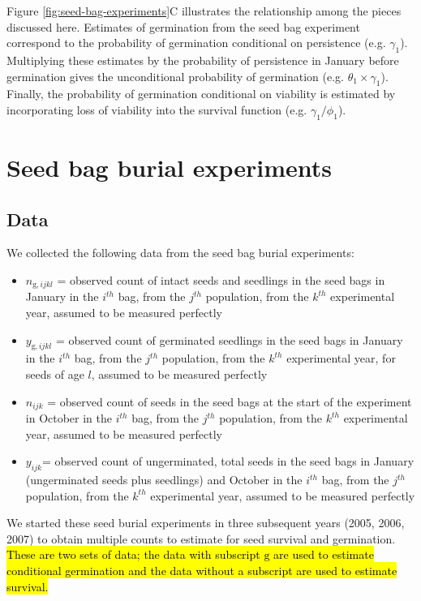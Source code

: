 \documentclass[12pt, oneside, titlepage]{article}   	%
\begin{document}
Figure \ref{fig:seed-bag-experiments}C illustrates the relationship among the pieces discussed here. Estimates of germination from the seed bag experiment correspond to the probability of germination conditional on persistence (e.g. $\gamma_1$). Multiplying these estimates by the probability of persistence in January before germination gives the unconditional probability of germination (e.g. $\theta_1 \times \gamma_1$). Finally, the probability of germination conditional on viability is estimated by incorporating loss of viability into the survival function (e.g. $\gamma_1 / \phi_1$).

\section{Seed bag burial experiments}\label{section-2}

\subsection{Data}

We collected the following data from the seed bag burial experiments:

\begin{itemize}
	\item $n_{\mathrm{g},ijkl}$ = observed count of intact seeds and seedlings in the seed bags in January in the $i^{th}$ bag, from the $j^{th}$ population, from the $k^{th}$ experimental year, assumed to be measured perfectly 
	\item $y_{\mathrm{g},ijkl}$ = observed count of germinated seedlings in the seed bags in January in the $i^{th}$ bag, from the $j^{th}$ population, from the $k^{th}$ experimental year, for seeds of age $l$, assumed to be measured perfectly 
	\item $n_{ijk}$ = observed count of seeds in the seed bags at the start of the experiment in October in the $i^{th}$ bag, from the $j^{th}$ population, from the $k^{th}$ experimental year, assumed to be measured perfectly 
	\item $y_{ijk}$= observed count of ungerminated, total seeds in the seed bags in January (ungerminated seeds plus seedlings) and October in the $i^{th}$ bag, from the $j^{th}$ population, from the $k^{th}$ experimental year, assumed to be measured perfectly
\end{itemize}

We started these seed burial experiments in three subsequent years (2005, 2006, 2007) to obtain multiple counts to estimate for seed survival and germination. \hl{These are two sets of data; the data with subscript $\mathrm{g}$ are used to estimate conditional germination and the data without a subscript are used to estimate survival.}
\end{document}
